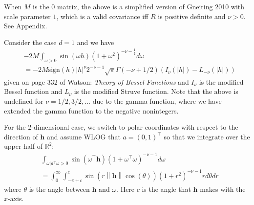 \documentclass[11pt]{article}
\begin{document}
When $M$ is the $0$ matrix, the above is a simplified version of Gneiting 2010 with scale parameter $1$, which is a valid covariance iff $R$ is positive definite and $\nu > 0$. See Appendix.

% 
 Consider the case $d=1$ and we have 
  \begin{align*}
&-2M\int_{\omega > 0}\sin(\omega h)(1 + \omega^2)^{-\nu- \frac{1}{2}} d\omega \\
&=-2M \textrm{sign}(h) |h|^{\nu} 2^{-\nu-1} \sqrt{\pi} \Gamma(-\nu + 1/2)\left(I_{\nu}(|h|) - L_{-\nu} (|h|)\right)
 \end{align*}given on page 332 of Watson: \textit{Theory of Bessel Functions} and $I_\nu$ is the modified Bessel function and $L_\nu$ is the modified Struve function. Note that the above is undefined for $\nu = 1/2, 3/2, \dots$ due to the gamma function, where we have extended the gamma function to the negative nonintegers. 
 
 
 For the 2-dimensional case, we switch to polar coordinates with respect to the direction of $\boldsymbol{h}$ and assume WLOG that $a = (0,1)^\top$ so that we integrate over the upper half of $\mathbb{R}^2$: \begin{align*}
&\int_{\omega | a^\top \omega > 0}\sin(\omega^\top \boldsymbol{h})(1 + \omega^\top \omega)^{-\nu- 1} d\omega \\
&= \int_0^\infty  \int_{-\pi + c}^{c} \sin(r\left\lVert \boldsymbol{h}\right\rVert \cos(\theta)) (1 +r^2)^{- \nu - 1} r d\theta dr %
 \end{align*}where $\theta$ is the angle between $\boldsymbol{h}$ and $\omega$. Here $c$ is the angle that $\boldsymbol{h}$ makes with the $x$-axis.
 
\end{document}
